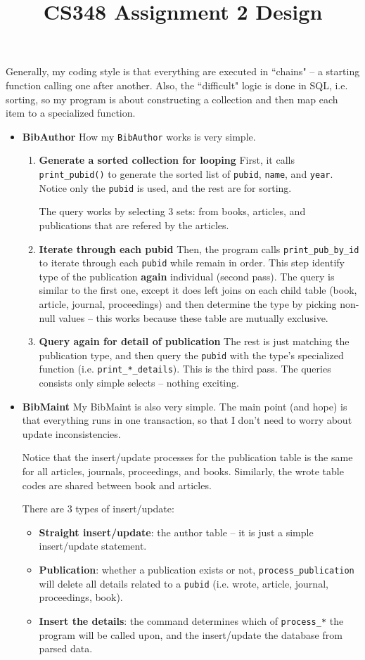 \documentclass[12pt]{article}
\title{CS348 Assignment 2 Design}
\begin{document}
\maketitle

Generally, my coding style is that everything are executed in ``chains" -- a starting function calling one after another.
Also, the ``difficult" logic is done in SQL, i.e. sorting, so my program is about constructing a collection and then map each item to a specialized function.

\begin{itemize}
\item
{\bf BibAuthor}
How my {\tt BibAuthor} works is very simple. 
\begin{enumerate}
\item
{\bf Generate a sorted collection for looping} First, it calls {\tt print\_pubid()} to generate the sorted list of {\tt pubid}, {\tt name}, and {\tt year}.
Notice only the {\tt pubid} is used, and the rest are for sorting.

The query works by selecting 3 sets: from books, articles, and publications that are refered by the articles.
\item
{\bf Iterate through each pubid} Then, the program calls {\tt print\_pub\_by\_id} to iterate through each {\tt pubid} while remain in order.
This step identify type of the publication {\bf again} individual (second pass).
The query is similar to the first one, except it does left joins on each child table (book, article, journal, proceedings) and then determine the type by picking non-null values -- this works because these table are mutually exclusive.
\item
{\bf Query again for detail of publication} The rest is just matching the publication type, and then query the {\tt pubid} with the type's specialized function (i.e. {\tt print\_*\_details}).
This is the third pass.
The queries consists only simple selects -- nothing exciting.
\end{enumerate}
\item
{\bf BibMaint}
My BibMaint is also very simple.
The main point (and hope) is that everything runs in one transaction, so that I don't need to worry about update inconsistencies.

Notice that the insert/update processes for the publication table is the same for all articles, journals, proceedings, and books.
Similarly, the wrote table codes are shared between book and articles.

There are 3 types of insert/update:
\begin{itemize}
\item
{\bf Straight insert/update}: the author table -- it is just a simple insert/update statement.
\item
{\bf Publication}: whether a publication exists or not, {\tt process\_publication} will delete all details related to a {\tt pubid} (i.e. wrote, article, journal, proceedings, book).
\item
{\bf Insert the details}: the command determines which of {\tt process\_*} the program will be called upon, and the insert/update the database from parsed data.
\end{itemize}
\end{itemize}
\end{document}
